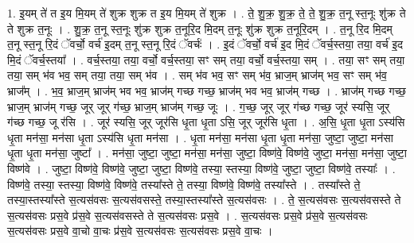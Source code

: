 \documentclass[17pt]{extarticle}
\begin{document}
1. इ॒यम् ते॑ त इ॒य मि॒यम् ते॑ शुक्र शुक्र त इ॒य मि॒यम् ते॑ शुक्र । . ते॒ शु॒क्र॒ शु॒क्र॒ ते॒ ते॒ शु॒क्र॒ त॒नू स्त॒नूः शु॑क्र ते ते शुक्र त॒नूः । . शु॒क्र॒ त॒नू स्त॒नूः शु॑क्र शुक्र त॒नूरि॒द मि॒दम् त॒नूः शु॑क्र शुक्र त॒नूरि॒दम् । . त॒नू रि॒द मि॒दम् त॒नू स्त॒नू रि॒दं ॅवर्चो॒ वर्च॑ इ॒दम् त॒नू स्त॒नू रि॒दं ॅवर्चः॑ । . इ॒दं ॅवर्चो॒ वर्च॑ इ॒द मि॒दं ॅवर्च॒स्तया॒ तया॒ वर्च॑ इ॒द मि॒दं ॅवर्च॒स्तया᳚ । . वर्च॒स्तया॒ तया॒ वर्चो॒ वर्च॒स्तया॒ सꣳ सम् तया॒ वर्चो॒ वर्च॒स्तया॒ सम् । . तया॒ सꣳ सम् तया॒ तया॒ सम् भ॑व भव॒ सम् तया॒ तया॒ सम् भ॑व । . सम् भ॑व भव॒ सꣳ सम् भ॑व॒ भ्राज॒म् भ्राज॑म् भव॒ सꣳ सम् भ॑व॒ भ्राज᳚म् । . भ॒व॒ भ्राज॒म् भ्राज॑म् भव भव॒ भ्राज॑म् गच्छ गच्छ॒ भ्राज॑म् भव भव॒ भ्राज॑म् गच्छ । . भ्राज॑म् गच्छ गच्छ॒ भ्राज॒म् भ्राज॑म् गच्छ॒ जूर् जूर् ग॑च्छ॒ भ्राज॒म् भ्राज॑म् गच्छ॒ जूः । . ग॒च्छ॒ जूर् जूर् ग॑च्छ गच्छ॒ जूर॑ स्यसि॒ जूर् ग॑च्छ गच्छ॒ जू र॑सि । . जूर॑ स्यसि॒ जूर् जूर॑सि धृ॒ता धृ॒ता ऽसि॒ जूर् जूर॑सि धृ॒ता । . अ॒सि॒ धृ॒ता धृ॒ता ऽस्य॑सि धृ॒ता मन॑सा॒ मन॑सा धृ॒ता ऽस्य॑सि धृ॒ता मन॑सा । . धृ॒ता मन॑सा॒ मन॑सा धृ॒ता धृ॒ता मन॑सा॒ जुष्टा॒ जुष्टा॒ मन॑सा धृ॒ता धृ॒ता मन॑सा॒ जुष्टा᳚ । . मन॑सा॒ जुष्टा॒ जुष्टा॒ मन॑सा॒ मन॑सा॒ जुष्टा॒ विष्ण॑वे॒ विष्ण॑वे॒ जुष्टा॒ मन॑सा॒ मन॑सा॒ जुष्टा॒ विष्ण॑वे । . जुष्टा॒ विष्ण॑वे॒ विष्ण॑वे॒ जुष्टा॒ जुष्टा॒ विष्ण॑वे॒ तस्या॒ स्तस्या॒ विष्ण॑वे॒ जुष्टा॒ जुष्टा॒ विष्ण॑वे॒ तस्याः᳚ । . विष्ण॑वे॒ तस्या॒ स्तस्या॒ विष्ण॑वे॒ विष्ण॑वे॒ तस्या᳚स्ते ते॒ तस्या॒ विष्ण॑वे॒ विष्ण॑वे॒ तस्या᳚स्ते । . तस्या᳚स्ते ते॒ तस्या॒स्तस्या᳚स्ते स॒त्यस॑वसः स॒त्यस॑वसस्ते॒ तस्या॒स्तस्या᳚स्ते स॒त्यस॑वसः । . ते॒ स॒त्यस॑वसः स॒त्यस॑वसस्ते ते स॒त्यस॑वसः प्रस॒वे प्र॑स॒वे स॒त्यस॑वसस्ते ते स॒त्यस॑वसः प्रस॒वे । . स॒त्यस॑वसः प्रस॒वे प्र॑स॒वे स॒त्यस॑वसः स॒त्यस॑वसः प्रस॒वे वा॒चो वा॒चः प्र॑स॒वे स॒त्यस॑वसः स॒त्यस॑वसः प्रस॒वे वा॒चः । \newline
\end{document}
